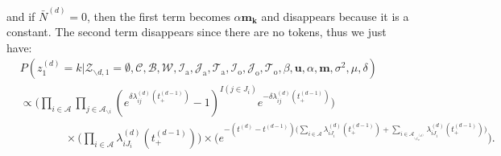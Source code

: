 \documentclass[a4paper]{article}
\begin{document}
 and if $\bar N^{(d)} = 0$, then the first term becomes $\alpha\boldsymbol{m_k}$ and disappears because it is a constant. The second term disappears since there are no tokens, thus we just have:
  \begin{equation}
  \begin{aligned}
  &P(z^{(d)}_1=k|\mathcal{Z}_{\backslash d, 1}=\emptyset,   \mathcal{C},   \mathcal{B},\mathcal{W}, \mathcal{I}_{\mbox{a}}, \mathcal{J}_{\mbox{a}}, \mathcal{T}_{\mbox{a}}, \mathcal{I}_{\mbox{o}}, \mathcal{J}_{\mbox{o}}, \mathcal{T}_{\mbox{o}}, \beta, \boldsymbol{u}, \alpha, \boldsymbol{m}, \sigma^2, \mu, \delta)\\&\propto\Big(\prod_{i\in \mathcal{A}}\prod_{j \in \mathcal{A}_{\backslash i }} (e^{\delta\lambda^{(d)}_{ij}(t_+^{(d-1)})}-1)^{I(j \in J_i)}e^{-\delta\lambda^{(d)}_{ij}(t_+^{(d-1)})}\Big)\\&\quad\quad\quad\quad \times \Big(\prod_{i\in \mathcal{A}} \lambda^{(d)}_{iJ_i}(t_+^{(d-1)})\Big)\times \Big(e^{-(t^{(d)}-t^{(d-1)})\big(\sum\limits_{i \in \mathcal{A}}\lambda^{(d)}_{i{J_i}}(t_+^{(d-1)})+\sum\limits_{i \in \mathcal{A}_{\backslash i_o^{(d)}}}\lambda^{(d)}_{i{J_i}}(t_+^{(d-1)})\big)}\Big).
  \end{aligned}
  \end{equation}
\end{document}
